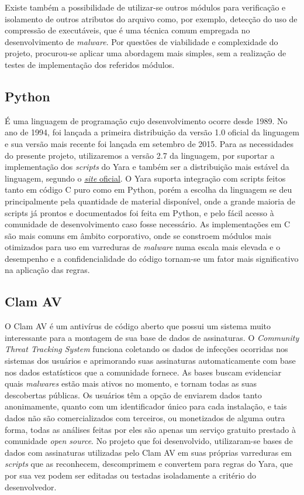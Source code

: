 Existe também a possibilidade de utilizar-se outros módulos para verificação e
isolamento de outros atributos do arquivo como, por exemplo, detecção do uso de
compressão de executáveis, que é uma técnica comum empregada no desenvolvimento
de \textit{malware}. Por questões de viabilidade e complexidade do projeto,
procurou-se aplicar uma abordagem mais simples, sem a realização de testes de
implementação dos referidos módulos.

\subsection{Python}
\label{sub:python}

É uma linguagem de programação cujo desenvolvimento ocorre desde 1989. No ano de
1994, foi lançada a primeira distribuição da versão 1.0 oficial da linguagem e
sua versão mais recente foi lançada em setembro de 2015. Para as necessidades do
presente projeto, utilizaremos a versão 2.7 da linguagem, por suportar a
implementação dos \textit{scripts} do Yara e também ser a distribuição mais
estável da linguagem, segundo o \href{www.python.org}{\textit{site} oficial}. O
Yara suporta integração com scripts feitos tanto em código C puro como em
Python, porém a escolha da linguagem se deu principalmente pela quantidade de
material disponível, onde a grande maioria de scripts já prontos e documentados
foi feita em Python,  e pelo fácil acesso à comunidade de desenvolvimento caso
fosse necessário. As implementações em C são mais comuns em âmbito corporativo,
onde se constroem módulos mais otimizados para uso em varreduras de
\textit{malware} numa escala mais elevada e o desempenho e a confidencialidade
do código tornam-se um fator mais significativo na aplicação das regras.

\subsection{Clam AV}
\label{sub:clamav}

O Clam AV é um antivírus de código aberto que possui um sistema muito
interessante para a montagem de sua base de dados de assinaturas. O
\textit{Community Threat Tracking System} funciona coletando os dados de
infecções ocorridas nos sistemas dos usuários e aprimorando suas assinaturas
automaticamente com base nos dados estatísticos que a comunidade fornece. As
bases buscam evidenciar quais \textit{malwares} estão mais ativos no momento, e
tornam todas as suas descobertas públicas. Os usuários têm a opção de enviarem
dados tanto anonimamente, quanto com um identificador único para cada
instalação, e tais dados não são comercializados com terceiros, ou monetizados
de alguma outra forma, todas as análises feitas por eles são apenas um serviço
gratuito prestado à comunidade \textit{open source}. No projeto que foi
desenvolvido, utilizaram-se bases de dados com assinaturas utilizadas pelo Clam
AV em suas próprias varreduras em \textit{scripts} que as reconhecem, descomprimem e
convertem para regras do Yara, que por sua vez podem ser editadas ou testadas
isoladamente a critério do desenvolvedor.


